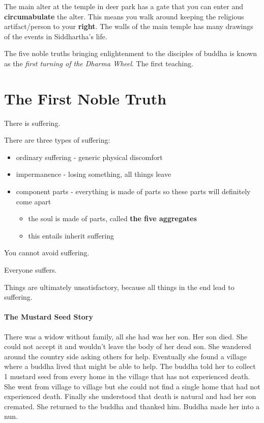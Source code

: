 \documentclass{article}
\begin{document}
The main alter at the temple in deer park has a gate that you can enter and \textbf{circumabulate} the alter. This means you walk around keeping the religious artifact/person to your \textbf{right}. The walls of the main temple has many drawings of the events in Siddhartha's life.

The five noble truths bringing enlightenment to the disciples of buddha is known as the \emph{first turning of the Dharma Wheel}. The first teaching.

\section*{The First Noble Truth}
\label{sec:the_first_noble_truth}
There is suffering.

There are three types of suffering:
\begin{itemize}
	\item ordinary suffering - generic physical discomfort
	\item impermanence - losing something, all things leave
	\item component parts - everything is made of parts so these parts will definitely come apart
	\begin{itemize}
		\item the soul is made of parts, called \textbf{the five aggregates}
		\item this entails inherit suffering
	\end{itemize}
\end{itemize}

You cannot avoid suffering.

Everyone suffers.

Things are ultimately unsatisfactory, because all things in the end lead to suffering.

\paragraph{The Mustard Seed Story}
\label{par:the_mustard_seed_story}
There was a widow without family, all she had was her son. Her son died. She could not accept it and wouldn't leave the body of her dead son. She wandered around the country side asking others for help. Eventually she found a village where a buddha lived that might be able to help. The buddha told her to collect 1 mustard seed from every home in the village that has not experienced death. She went from village to village but she could not find a single home that had not experienced death. Finally she understood that death is natural and had her son cremated. She returned to the buddha and thanked him. Buddha made her into a nun.
\end{document}
